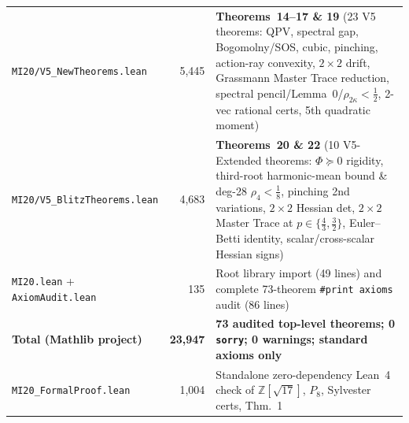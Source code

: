 \documentclass[10pt,letterpaper]{article}
\begin{document}
\begin{table}[htbp]
\begin{tabular}{@{}l r >{\raggedright\arraybackslash}p{8.4cm}@{}}
\texttt{MI20/V5\_NewTheorems.lean}       & 5,445 & \textbf{Theorems~14--17 \& 19} (23 V5 theorems: QPV, spectral gap, Bogomolny/SOS, cubic, pinching, action-ray convexity, $2\times 2$ drift, Grassmann Master Trace reduction, spectral pencil/Lemma~0/$\rho_{2\kappa}<\frac{1}{2}$, 2-vec rational certs, 5th quadratic moment) \\
\texttt{MI20/V5\_BlitzTheorems.lean}     & 4,683 & \textbf{Theorems~20 \& 22} (10 V5-Extended theorems: $\Phi\succeq 0$ rigidity, third-root harmonic-mean bound \& deg-28 $\rho_4<\frac{1}{8}$, pinching 2nd variations, $2\times 2$ Hessian det, $2\times 2$ Master Trace at $p\in\{\tfrac{4}{3},\tfrac{3}{2}\}$, Euler--Betti identity, scalar/cross-scalar Hessian signs) \\
\texttt{MI20.lean} + \texttt{AxiomAudit.lean} & 135 & Root library import (49 lines) and complete 73-theorem \texttt{\#print axioms} audit (86 lines) \\
\midrule
\textbf{Total (Mathlib project)}         & \textbf{23,947} & \textbf{73 audited top-level theorems; 0 \texttt{sorry}; 0 warnings; standard axioms only} \\
\texttt{MI20\_FormalProof.lean}          &  1,004 & Standalone zero-dependency Lean~4 check of $\mathbb{Z}[\sqrt{17}]$, $P_8$, Sylvester certs, Thm.~1 \\
\bottomrule
\end{tabular}
\label{tab:lean}
\end{table}
\end{document}
